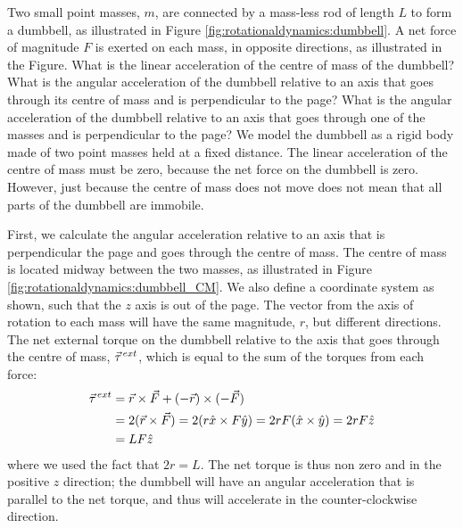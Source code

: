 \begin{example}{ Two small point masses, $m$, are connected by a mass-less rod of length $L$ to form a dumbbell, as illustrated in Figure \ref{fig:rotationaldynamics:dumbbell}. A net force of magnitude $F$ is exerted on each mass, in opposite directions, as illustrated in the Figure. What is the linear acceleration of the centre of mass of the dumbbell? What is the angular acceleration of the dumbbell relative to an axis that goes through its centre of mass and is perpendicular to the page? What is the angular acceleration of the dumbbell relative to an axis that goes through one of the masses and is perpendicular to the page? }
We model the dumbbell as a rigid body made of two point masses held at a fixed distance. The linear acceleration of the centre of mass must be zero, because the net force on the dumbbell is zero. However, just because the centre of mass does not move does not mean that all parts of the dumbbell are immobile.

First, we calculate the angular acceleration relative to an axis that is perpendicular the page and goes through the centre of mass. The centre of mass is located midway between the two masses, as illustrated in Figure \ref{fig:rotationaldynamics:dumbbell_CM}. We also define a coordinate system as shown, such that the $z$ axis is out of the page.
The vector from the axis of rotation to each mass will have the same magnitude, $r$, but different directions. The net external torque on the dumbbell relative to the axis that goes through the centre of mass, $\pvec\tau^{ext}$, which is equal to the sum of the torques from each force:
\begin{align*}
\pvec\tau^{ext}&= \vec r \times \vec F + (-\vec r) \times (-\vec F) \\
&= 2 (\vec r \times \vec F)=2 (r\hat x \times F\hat y) = 2rF (\hat x \times \hat y)=2rF\hat z\\
&=LF\hat z
\end{align*}
where we used the fact that $2r = L$. The net torque is thus non zero and in the positive $z$ direction; the dumbbell will have an angular acceleration that is parallel to the net torque, and thus will accelerate in the counter-clockwise direction.


\end{example}
